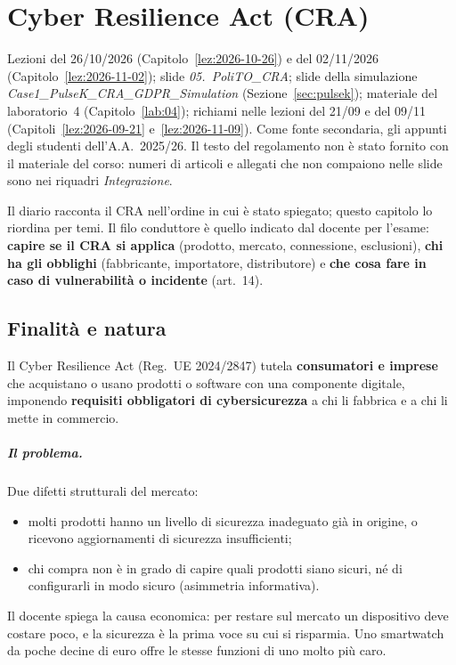 \chapter{Cyber Resilience Act (CRA)}
\label{cap:cra}

\begin{nota}[Fonti]
Lezioni del 26/10/2026 (Capitolo~\ref{lez:2026-10-26}) e del 02/11/2026 (Capitolo~\ref{lez:2026-11-02});
slide \emph{05.~PoliTO\_CRA}; slide della simulazione \emph{Case1\_PulseK\_CRA\_GDPR\_Simulation}
(Sezione~\ref{sec:pulsek}); materiale del laboratorio~4 (Capitolo~\ref{lab:04}); richiami nelle lezioni
del 21/09 e del 09/11 (Capitoli~\ref{lez:2026-09-21} e~\ref{lez:2026-11-09}). Come fonte secondaria, gli
appunti degli studenti dell'A.A.~2025/26. Il testo del regolamento non è stato fornito con il materiale
del corso: numeri di articoli e allegati che non compaiono nelle slide sono nei riquadri
\emph{Integrazione}.
\end{nota}

Il diario racconta il CRA nell'ordine in cui è stato spiegato; questo capitolo lo riordina per temi.
Il filo conduttore è quello indicato dal docente per l'esame: \textbf{capire se il CRA si applica}
(prodotto, mercato, connessione, esclusioni), \textbf{chi ha gli obblighi} (fabbricante, importatore,
distributore) e \textbf{che cosa fare in caso di vulnerabilità o incidente} (art.~14).

\section{Finalità e natura}
\label{sec:cra-finalita}

Il Cyber Resilience Act (Reg.~UE 2024/2847) tutela \textbf{consumatori e imprese} che acquistano o usano
prodotti o software con una componente digitale, imponendo \textbf{requisiti obbligatori di
cybersicurezza} a chi li fabbrica e a chi li mette in commercio.

\paragraph{Il problema.} Due difetti strutturali del mercato:
\begin{itemize}
  \item molti prodotti hanno un livello di sicurezza inadeguato già in origine, o ricevono aggiornamenti
    di sicurezza insufficienti;
  \item chi compra non è in grado di capire quali prodotti siano sicuri, né di configurarli in modo sicuro
    (asimmetria informativa).
\end{itemize}
Il docente spiega la causa economica: per restare sul mercato un dispositivo deve costare poco, e la
sicurezza è la prima voce su cui si risparmia. Uno smartwatch da poche decine di euro offre le stesse
funzioni di uno molto più caro.

